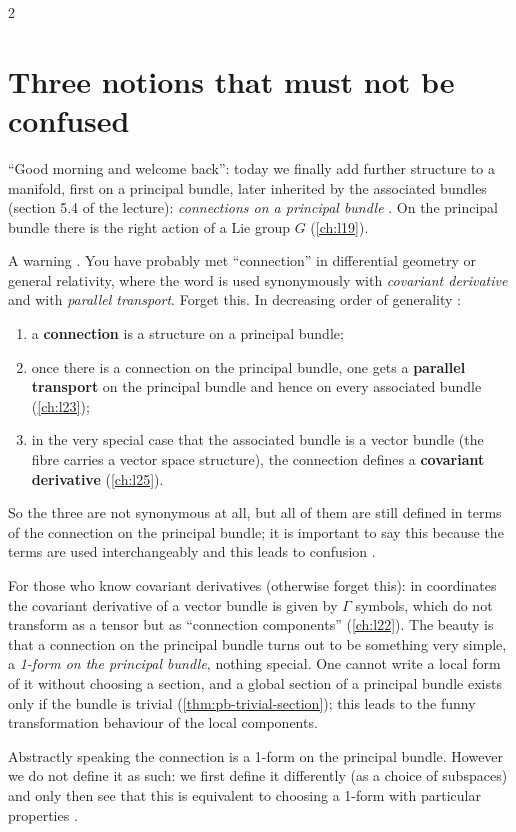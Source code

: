 \begin{paracol}{2}
\section{Three notions that must not be confused}\label{sec:cn-terms}

``Good morning and welcome back'': today we finally add further structure to a manifold, first on a principal bundle, later inherited by the associated bundles (section 5.4 of the lecture): \emph{connections on a principal bundle}  . On the principal bundle there is the right action of a Lie group $G$ (\cref{ch:l19}).

A warning . You have probably met ``connection'' in differential geometry or general relativity, where the word is used synonymously with \emph{covariant derivative} and with \emph{parallel transport}. Forget this. In decreasing order of generality :
\begin{enumerate}
  \item a \textbf{connection} is a structure on a principal bundle;
  \item once there is a connection on the principal bundle, one gets a \textbf{parallel transport} on the principal bundle and hence on every associated bundle (\cref{ch:l23});
  \item in the very special case that the associated bundle is a vector bundle (the fibre carries a vector space structure), the connection defines a \textbf{covariant derivative} (\cref{ch:l25}).
\end{enumerate}
    So the three are not synonymous at all, but all of them are still defined in terms of the connection on the principal bundle; it is important to say this because the terms are used interchangeably and this leads to confusion .
\begin{coursenote}
For those who know covariant derivatives (otherwise forget this): in coordinates the covariant derivative of a vector bundle is given by $\Gamma$ symbols, which do not transform as a tensor but as ``connection components'' (\cref{ch:l22}). The beauty is that a connection on the principal bundle turns out to be something very simple, a \emph{1-form on the principal bundle}, nothing special. One cannot write a local form of it without choosing a section, and a global section of a principal bundle exists only if the bundle is trivial (\cref{thm:pb-trivial-section}); this leads to the funny transformation behaviour of the local components.   
\end{coursenote}
Abstractly speaking the connection is a 1-form on the principal bundle. However we do not define it as such: we first define it differently (as a choice of subspaces) and only then see that this is equivalent to choosing a 1-form with particular properties  .


\end{paracol}

